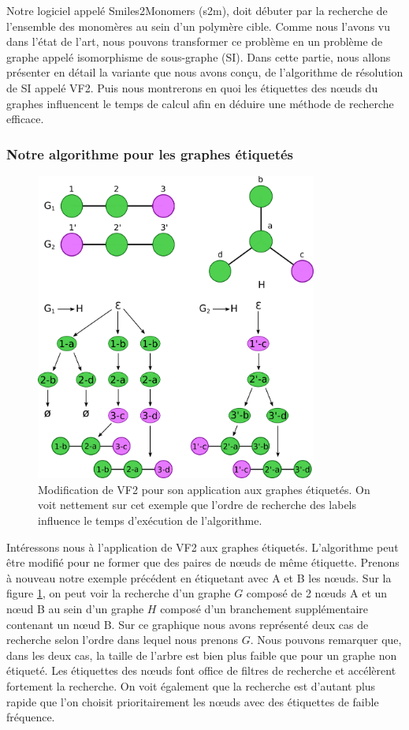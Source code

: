 \label{isomorphisme_p}

Notre logiciel appelé Smiles2Monomers (s2m), doit débuter par la recherche de l'ensemble des monomères au sein d'un polymère cible.
Comme nous l'avons vu dans l'état de l'art, nous pouvons transformer ce problème en un problème de graphe appelé isomorphisme de sous-graphe (SI).
Dans cette partie, nous allons présenter en détail la variante que nous avons conçu, de l'algorithme de résolution de SI appelé VF2.
Puis nous montrerons en quoi les étiquettes des n\oe{}uds du graphes influencent le temps de calcul afin en déduire une méthode de recherche efficace.

\subsubsection{Notre algorithme pour les graphes étiquetés}


\begin{figure}[!ht]
  \begin{center}
    \includegraphics[width=350px]{Figures/s2m/recherche/VF2_labels.png}
    \caption{\label{vf2_labels}Modification de VF2 pour son application aux graphes étiquetés.
    On voit nettement sur cet exemple que l'ordre de recherche des labels influence le temps d'exécution de l'algorithme.}
  \end{center}
\end{figure}

Intéressons nous à l'application de VF2 aux graphes étiquetés.
L'algorithme peut être modifié pour ne former que des paires de n\oe{}uds de même étiquette.
Prenons à nouveau notre exemple précédent en étiquetant avec A et B les n\oe{}uds.
Sur la figure \ref{vf2_labels}, on peut voir la recherche d'un graphe $G$ composé de 2 n\oe{}uds A et un n\oe{}ud B au sein d'un graphe $H$
composé d'un branchement supplémentaire contenant un n\oe{}ud B.
Sur ce graphique nous avons représenté deux cas de recherche selon l'ordre dans lequel nous prenons $G$.
Nous pouvons remarquer que, dans les deux cas, la taille de l'arbre est bien plus faible que pour un graphe non étiqueté.
Les étiquettes des n\oe{}uds font office de filtres de recherche et accélèrent fortement la recherche.
On voit également que la recherche est d'autant plus rapide que l'on choisit prioritairement les n\oe{}uds avec des étiquettes de faible fréquence.

